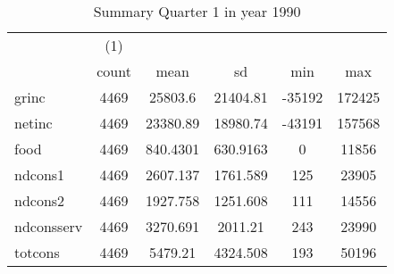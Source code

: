 \begin{table}[htbp]\centering
\def\sym#1{\ifmmode^{#1}\else\(^{#1}\)\fi}
\caption{Summary Quarter 1 in year 1990 \label{sum\_Q1\_y1990}}
\begin{tabular}{l*{1}{ccccc}}
\hline\hline
            &\multicolumn{1}{c}{(1)}&            &            &            &            \\
            &       count&        mean&          sd&         min&         max\\
\hline
grinc       &        4469&     25803.6&    21404.81&      -35192&      172425\\
netinc      &        4469&    23380.89&    18980.74&      -43191&      157568\\
food        &        4469&    840.4301&    630.9163&           0&       11856\\
ndcons1     &        4469&    2607.137&    1761.589&         125&       23905\\
ndcons2     &        4469&    1927.758&    1251.608&         111&       14556\\
ndconsserv  &        4469&    3270.691&     2011.21&         243&       23990\\
totcons     &        4469&     5479.21&    4324.508&         193&       50196\\
\hline\hline
\end{tabular}
\end{table}
